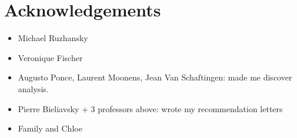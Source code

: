 \chapter*{Acknowledgements}

\begin{itemize}
    \item Michael Ruzhansky
    \item Veronique Fischer
    \item Augusto Ponce, Laurent Moonens, Jean Van Schaftingen: made me discover analysis.
    \item Pierre Bieliavsky + 3 professors above: wrote my recommendation letters
    \item Family and Chloe
\end{itemize}
